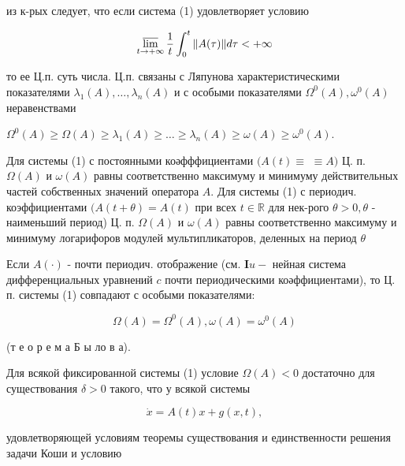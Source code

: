 \documentclass[10pt]{article}
\begin{document}
из к-рых следует, что если система (1) удовлетворяет условию



\[

\varlimsup_{t \rightarrow+\infty} \frac{1}{t} \int_{0}^{t}\|A(\tau)\| d \tau<+\infty

\]



то ее Ц.п. суть числа. Ц.п. связаны с Ляпунова характеристическими показателями $\lambda_{1}(A), \ldots, \lambda_{n}(A)$ и с особыми показателями $\Omega^{0}(A), \omega^{0}(A)$ неравенствами



$\Omega^{0}(A) \geqslant \Omega(A) \geqslant \lambda_{1}(A) \geqslant \ldots \geqslant \lambda_{n}(A) \geqslant \omega(A) \geqslant \omega^{0}(A)$.



Для системы (1) с постоянными коәфффициентами $(A(t) \equiv$ $\equiv A)$ Ц. п. $\Omega(A)$ и $\omega(A)$ равны соответственно максимуму и минимуму действительных частей собственных значений оператора $A$. Для системы (1) с периодич. коэффициентами $(A(t+\theta)=A(t)$ при всех $t \in \mathbb{R}$ для нек-рого $\theta>0, \theta$ - наименьший период) Ц. п. $\Omega(A)$ и $\omega(A)$ равны соответственно максимуму и минимуму логарифоров модулей мультипликаторов, деленных на период $\theta$



Если $A(\cdot)$ - почти периодич. отображение (см. $\boldsymbol{I} u-$ нейная система дифференциальных уравнений $c$ почти периодическими коәффициентами), то Ц. п. системы (1) совпадают с особыми показателями:



\[

\Omega(A)=\Omega^{0}(A), \omega(A)=\omega^{0}(A)

\]



(т е о р е м а Б ы ло в а).



Для всякой фиксированной системы (1) условие $\Omega(A)<0$ достаточно для существования $\delta>0$ такого, что у всякой системы



\[

\dot{x}=A(t) x+g(x, t),

\]



удовлетворяющей условиям теоремы существования и единственности решения задачи Коши и условию
\end{document}
